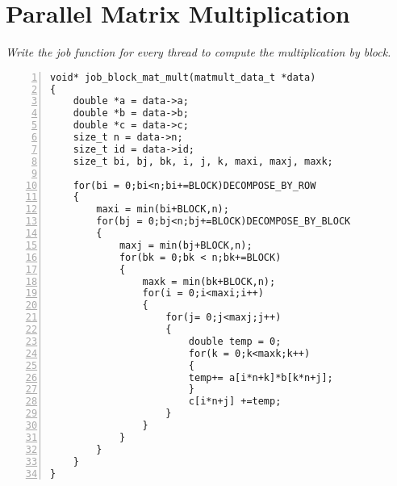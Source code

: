 \documentclass{article}
\begin{document}
\section{Parallel Matrix Multiplication}

\begin{ExerciseList}
\Exercise
{}
\Question
\emph{Write the job function for every thread to compute the
  multiplication by block.}

\begin{lstlisting}[basicstyle=\small\sffamily,
keywords={break,case,const,continue,default,else,enum,
for,if,return,switch,while,do,long,void,int,float,double,
char,struct,typedef,include,size\_t},
keywordstyle={\color{blue}},
comment={[l]{//}}, morecomment={[s]{/*}{*/}}, commentstyle=\itshape,
columns={[l]flexible}, numbers=left, numberstyle=\tiny,
frameround=fftt, frame=shadowbox, captionpos=b,
caption={Parallelized matrix multiplication by block.},
label=LST:blockmatmult]
void* job_block_mat_mult(matmult_data_t *data)
{
    double *a = data->a;
    double *b = data->b;
    double *c = data->c;
    size_t n = data->n;
    size_t id = data->id;
    size_t bi, bj, bk, i, j, k, maxi, maxj, maxk;

    for(bi = 0;bi<n;bi+=BLOCK)DECOMPOSE_BY_ROW
    {
        maxi = min(bi+BLOCK,n);
        for(bj = 0;bj<n;bj+=BLOCK)DECOMPOSE_BY_BLOCK
        {
            maxj = min(bj+BLOCK,n);
            for(bk = 0;bk < n;bk+=BLOCK)
            {
                maxk = min(bk+BLOCK,n);
                for(i = 0;i<maxi;i++)
                {
                    for(j= 0;j<maxj;j++)
                    {
                        double temp = 0;
                        for(k = 0;k<maxk;k++)
                        {
                        temp+= a[i*n+k]*b[k*n+j];
                        }
                        c[i*n+j] +=temp;
                    }
                }
            }
        }
    }
}
\end{lstlisting}

\end{ExerciseList}
\end{document}
